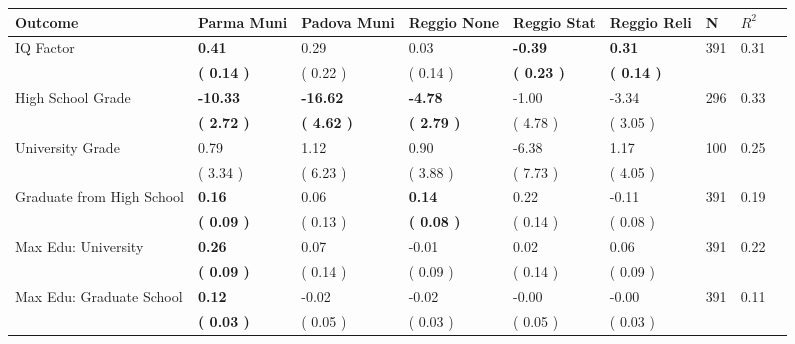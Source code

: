 \begin{tabular}{L{6.2cm} C{1.8cm} C{1.8cm} C{1.8cm} C{1.8cm} C{1.8cm} C{1.8cm} C{0.3cm} C{0.3cm}}
\toprule
 \textbf{Outcome} & \textbf{Parma Muni} & \textbf{Padova Muni} & \textbf{Reggio None} & \textbf{Reggio Stat} & \textbf{Reggio Reli} & \textbf{N} & \textbf{$ R^2$} \\
\midrule
IQ Factor & \textbf{     0.41} &      0.29 &      0.03 & \textbf{    -0.39} & \textbf{     0.31}  & 391 &       0.31 \\ 
 & \textbf{(     0.14 )} & (     0.22 ) & (     0.14 ) & \textbf{(     0.23 )} & \textbf{(     0.14 )}  & \\
High School Grade & \textbf{   -10.33} & \textbf{   -16.62} & \textbf{    -4.78} &     -1.00 &     -3.34  & 296 &       0.33 \\ 
 & \textbf{(     2.72 )} & \textbf{(     4.62 )} & \textbf{(     2.79 )} & (     4.78 ) & (     3.05 )  & \\
University Grade &      0.79 &      1.12 &      0.90 &     -6.38 &      1.17  & 100 &       0.25 \\ 
 & (     3.34 ) & (     6.23 ) & (     3.88 ) & (     7.73 ) & (     4.05 )  & \\
Graduate from High School & \textbf{     0.16} &      0.06 & \textbf{     0.14} &      0.22 &     -0.11  & 391 &       0.19 \\ 
 & \textbf{(     0.09 )} & (     0.13 ) & \textbf{(     0.08 )} & (     0.14 ) & (     0.08 )  & \\
Max Edu: University & \textbf{     0.26} &      0.07 &     -0.01 &      0.02 &      0.06  & 391 &       0.22 \\ 
 & \textbf{(     0.09 )} & (     0.14 ) & (     0.09 ) & (     0.14 ) & (     0.09 )  & \\
Max Edu: Graduate School & \textbf{     0.12} &     -0.02 &     -0.02 &     -0.00 &     -0.00  & 391 &       0.11 \\ 
 & \textbf{(     0.03 )} & (     0.05 ) & (     0.03 ) & (     0.05 ) & (     0.03 )  & \\
\bottomrule
\end{tabular}

